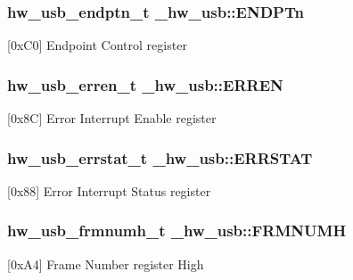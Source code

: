 \subsubsection[{\texorpdfstring{E\+N\+D\+P\+Tn}{ENDPTn}}]{ {\bf hw\+\_\+usb\+\_\+endptn\+\_\+t} \+\_\+hw\+\_\+usb\+::\+E\+N\+D\+P\+Tn}\hypertarget{struct__hw__usb_a1742e9e070408dcd32e7f957604a4bdc}{}\label{struct__hw__usb_a1742e9e070408dcd32e7f957604a4bdc}
\mbox{[}0x\+C0\mbox{]} Endpoint Control register 
\subsubsection[{\texorpdfstring{E\+R\+R\+EN}{ERREN}}]{ {\bf hw\+\_\+usb\+\_\+erren\+\_\+t} \+\_\+hw\+\_\+usb\+::\+E\+R\+R\+EN}\hypertarget{struct__hw__usb_af8b4474a15036909bbcc30aaef6d3b18}{}\label{struct__hw__usb_af8b4474a15036909bbcc30aaef6d3b18}
\mbox{[}0x8C\mbox{]} Error Interrupt Enable register 
\subsubsection[{\texorpdfstring{E\+R\+R\+S\+T\+AT}{ERRSTAT}}]{ {\bf hw\+\_\+usb\+\_\+errstat\+\_\+t} \+\_\+hw\+\_\+usb\+::\+E\+R\+R\+S\+T\+AT}\hypertarget{struct__hw__usb_a856d3e410aa6e883a4964be145b2634f}{}\label{struct__hw__usb_a856d3e410aa6e883a4964be145b2634f}
\mbox{[}0x88\mbox{]} Error Interrupt Status register 
\subsubsection[{\texorpdfstring{F\+R\+M\+N\+U\+MH}{FRMNUMH}}]{ {\bf hw\+\_\+usb\+\_\+frmnumh\+\_\+t} \+\_\+hw\+\_\+usb\+::\+F\+R\+M\+N\+U\+MH}\hypertarget{struct__hw__usb_af76317edd0c364f6777ea53509e3bfb0}{}\label{struct__hw__usb_af76317edd0c364f6777ea53509e3bfb0}
\mbox{[}0x\+A4\mbox{]} Frame Number register High 
